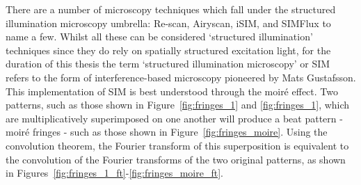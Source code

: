 There are a number of microscopy techniques which fall under the structured
illumination microscopy umbrella: Re-scan\cite{de2013re}, 
Airyscan\cite{huff2015airyscan}, iSIM\cite{york2013instant,curd2015construction},
and SIMFlux\cite{cnossen2020localization} to name a few. Whilst all these can be 
considered `structured illumination' techniques since they do rely on spatially 
structured excitation light, for the duration of this thesis the term 
`structured illumination microscopy' or SIM refers to the form of 
interference-based microscopy pioneered by Mats 
Gustafsson\cite{heintzmann1999laterally,gustafsson1999extended,gustafsson2000surpassing,gustafsson2008three}.
This implementation of SIM is best understood through the moir\'{e} effect.
Two patterns, such as those shown in Figure~\ref{fig:fringes_1} and 
\ref{fig:fringes_1}, which are multiplicatively superimposed on one another
will produce a beat pattern - moir\'{e} fringes - such as those shown in
Figure~\ref{fig:fringes_moire}. Using the convolution theorem, the Fourier
transform of this superposition is equivalent to the convolution of the 
Fourier transforms of the two original patterns\cite{mcgillem1991continuous},
as shown in Figures~\ref{fig:fringes_1_ft}-\ref{fig:fringes_moire_ft}. 

